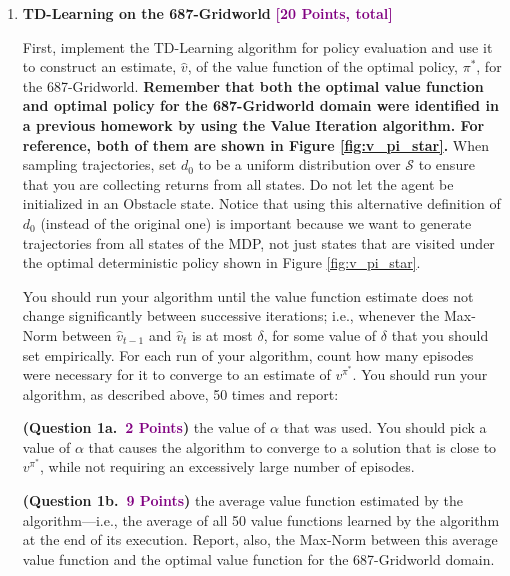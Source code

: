 \documentclass{article}
\newcommand{\POINTS}[1]{\textcolor{purple}{\textbf{{#1}}}}
\begin{document}
\vspace{0.6cm}

\begin{enumerate}
    \item {\Large{\textbf{TD-Learning on the 687-Gridworld} \POINTS{[20 Points, total]}}}
    
    First, implement the TD-Learning algorithm for policy evaluation and use it to construct an estimate, $\hat{v}$, of the value function of the optimal policy, $\pi^*$, for the 687-Gridworld. \textbf{Remember that both the optimal value function and optimal policy for the 687-Gridworld domain were identified in a previous homework by using the Value Iteration algorithm. For reference, both of them are shown in Figure \ref{fig:v_pi_star}.} When sampling trajectories, set $d_0$ to be a uniform distribution over $\mathcal{S}$ to ensure that you are collecting returns from all states. Do not let the agent be initialized in an Obstacle state. Notice that using this alternative definition of $d_0$ (instead of the original one) is important because we want to generate trajectories from all states of the MDP, not just states that are visited under the optimal deterministic policy shown in Figure \ref{fig:v_pi_star}. 
    
    \vspace{0.2cm}
    
    You should run your algorithm until the value function estimate does not change significantly between successive iterations; i.e., whenever the Max-Norm between $\hat{v}_{t-1}$ and $\hat{v}_t$ is at most $\delta$, for some value of $\delta$ that you should set empirically. For each run of your algorithm, count how many episodes were necessary for it to converge to an estimate of $v^{\pi^*}$. You should run your algorithm, as described above, 50 times and report: 
    \vspace{0.3cm}


        \textbf{(Question 1a.~\POINTS{2 Points})} the value of $\alpha$ that was used. You should pick a value of $\alpha$ that causes the algorithm to converge to a solution that is close to $v^{\pi^*}$, while not requiring an excessively large number of episodes.
        
        \textbf{(Question 1b.~\POINTS{9 Points})} the average value function estimated by the algorithm---i.e., the average of all 50 value functions learned by the algorithm at the end of its execution. Report, also, the Max-Norm between this average value function and the optimal value function for the 687-Gridworld domain.
        

\end{enumerate}
\end{document}
